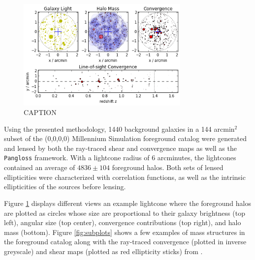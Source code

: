 \documentclass[%
 reprint,
 amsmath,amssymb,
 aps,nofootinbib
]{revtex4-1}
\begin{document}
\begin{figure}
    \centering
    \includegraphics[width=0.75\textwidth]{figs-swe/thesis/lightcone_plots.png}
    \captionsetup{justification=raggedright,singlelinecheck=false}
    \caption{CAPTION}
    \label{fig:lightcone}
\end{figure}

Using the presented methodology, 1440 background galaxies in a 144 arcmin$^2$ subset of the (0,0,0,0) Millennium Simulation foreground catalog were generated and lensed by both the ray-traced shear and convergence maps as well as the \texttt{Pangloss} framework. With a lightcone radius of 6 arcminutes, the lightcones contained an average of ${4836\pm104}$ foreground halos. Both sets of lensed ellipticities were characterized with correlation functions, as well as the intrinsic ellipticities of the sources before lensing.

Figure \ref{fig:lightcone} displays different views an example lightcone where the foreground halos are plotted as circles whose size are proportional to their galaxy brightness (top left), angular size (top center), convergence contributions (top right), and halo mass (bottom). Figure \ref{fig:subplots} shows a few examples of mass structures in the foreground catalog along with the ray-traced convergence (plotted in inverse greyscale) and shear maps (plotted as red ellipticity sticks) from \cite{ray_tracing}. 
\end{document}
